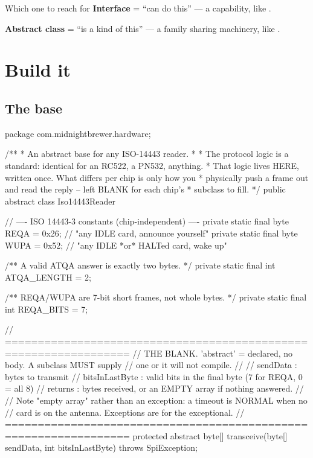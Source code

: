 \begin{concept}{Which one to reach for}
\textbf{Interface} = ``can do this'' --- a capability, like .

\textbf{Abstract class} = ``is a kind of this'' --- a family sharing machinery,
like .
\end{concept}

\section{Build it}

\subsection{The base}

\begin{jcode}
package com.midnightbrewer.hardware;

/**
 * An abstract base for any ISO-14443 reader.
 *
 * The protocol logic is a standard: identical for an RC522, a PN532, anything.
 * That logic lives HERE, written once. What differs per chip is only how you
 * physically push a frame out and read the reply -- left BLANK for each chip's
 * subclass to fill.
 */
public abstract class Iso14443Reader {

    // ---- ISO 14443-3 constants (chip-independent) ----
    private static final byte REQA = 0x26; // "any IDLE card, announce yourself"
    private static final byte WUPA = 0x52; // "any IDLE *or* HALTed card, wake up"

    /** A valid ATQA answer is exactly two bytes. */
    private static final int ATQA_LENGTH = 2;

    /** REQA/WUPA are 7-bit short frames, not whole bytes. */
    private static final int REQA_BITS = 7;

    // =================================================================
    // THE BLANK. 'abstract' = declared, no body. A subclass MUST supply
    // one or it will not compile.
    //
    //   sendData       : bytes to transmit
    //   bitsInLastByte : valid bits in the final byte (7 for REQA, 0 = all 8)
    //   returns        : bytes received, or an EMPTY array if nothing answered.
    //
    // Note "empty array" rather than an exception: a timeout is NORMAL when no
    // card is on the antenna. Exceptions are for the exceptional.
    // =================================================================
    protected abstract byte[] transceive(byte[] sendData, int bitsInLastByte)
            throws SpiException;

}
\end{jcode}
